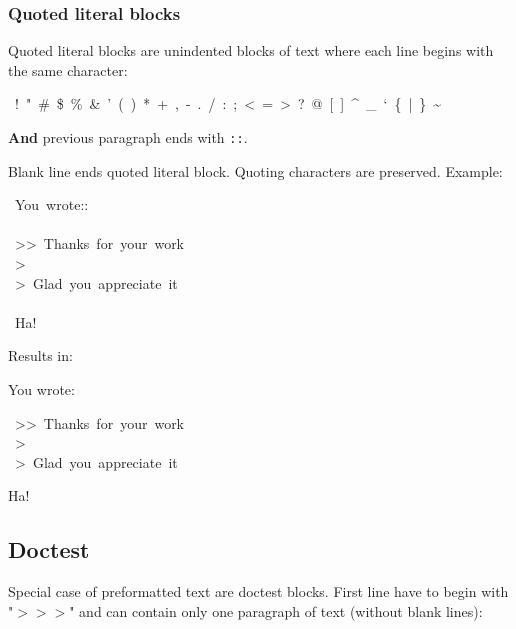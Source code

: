 \documentclass[12pt]{article}
\begin{document}
\hypertarget{lquoted-literal-blocks}{}
\subsubsection{Quoted literal blocks}

Quoted literal blocks are unindented blocks of text where each line begins
with the same character:

\begin{ttfamily}\begin{flushleft}
\mbox{~!~"~\#~\$~\%~\&~'~(~)~*~+~,~-~.~/~:~;~<~=~>~?~@~[~]~\^{}~\_~`~\{~|~\}~\~{}}\\
\end{flushleft}\end{ttfamily}

\textbf{And} previous paragraph ends with \texttt{::}.

Blank line ends quoted literal block. Quoting characters are preserved.
Example:

\begin{ttfamily}\begin{flushleft}
\mbox{~You~wrote::}\\
\mbox{}\\
\mbox{~>>~Thanks~for~your~work}\\
\mbox{~>}\\
\mbox{~>~Glad~you~appreciate~it}\\
\mbox{}\\
\mbox{~Ha!}\\
\end{flushleft}\end{ttfamily}

Results in:

You wrote:

\begin{ttfamily}\begin{flushleft}
\mbox{~>>~Thanks~for~your~work}\\
\mbox{~>}\\
\mbox{~>~Glad~you~appreciate~it}\\
\end{flushleft}\end{ttfamily}

Ha!

\hypertarget{ldoctest}{}
\subsection{Doctest}

Special case of preformatted text are doctest blocks. First line have to begin
with "$>$$>$$>$" and can contain only one paragraph of text (without blank lines):
\end{document}
